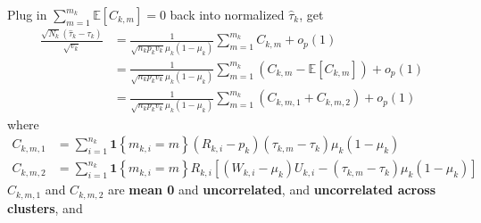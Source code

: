 \documentclass[twoside]{article}
\begin{document}
Plug in $\sum^{m_k}_{m=1}\mathbb{E}\left[C_{k,m}\right]=0$ back into normalized $\hat{\tau}_k$, get 
\begin{align*}
    \frac{\sqrt{N_k}\left(\hat{\tau}_k-\tau_k\right)}{\sqrt{v_k}} &= \frac{1}{\sqrt{n_kp_kv_k}\mu_k\left(1-\mu_k\right)}\sum^{m_k}_{m=1}C_{k,m} + o_p(1) \\
    &= \frac{1}{\sqrt{n_kp_kv_k}\mu_k\left(1-\mu_k\right)}\sum^{m_k}_{m=1}\left(C_{k,m}-\mathbb{E}\left[C_{k,m}\right]\right) + o_p(1) \\
    &= \frac{1}{\sqrt{n_kp_kv_k}\mu_k\left(1-\mu_k\right)}\sum^{m_k}_{m=1}\left( C_{k,m,1}+C_{k,m,2} \right) + o_p(1)
\end{align*}
where 
\begin{align*}
    C_{k,m,1} &= \sum^{n_k}_{i=1} \mathbf{1}\left\{m_{k,i}=m\right\}\left(R_{k,i}-p_k\right) \left(\tau_{k,m}-\tau_k\right) \mu_k \left(1-\mu_k\right) \\
    C_{k,m,2} &= \sum^{n_k}_{i=1} \mathbf{1}\left\{m_{k,i}=m\right\} R_{k,i} \left[\left(W_{k,i}-\mu_k\right)U_{k,i} - \left(\tau_{k,m}-\tau_k\right)\mu_k\left(1-\mu_k\right) \right]
\end{align*}
$C_{k,m,1}$ and $C_{k,m,2}$ are \textbf{mean 0} and \textbf{uncorrelated}, and \textbf{uncorrelated across clusters}, and
\end{document}
